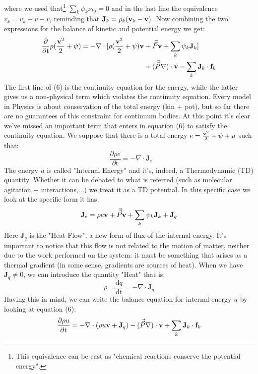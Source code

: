 \documentclass{article}
\newcommand*\diff{\mathop{}\!\mathrm{d}}
\newcommand*\Tder[1]{\mathop{}\!\frac{\diff #1}{\diff \mathrm{t}}}
\newcommand*\tder[1]{\mathop{}\!\frac{\partial #1}{\partial \mathrm{t}} }
\begin{document}
where we used that\footnote{This equivalence can be cast as "chemical reactions conserve the potential energy".} $\sum_k \psi_k\nu_{kj} = 0 $  and in the last line the equivalence $v_k = v_k +v -v$, reminding that $\mathbf{J}_k = \rho_k(\v_v_k -\v_v)$. Now combining the two expressions for the balance of kinetic and potential energy we get:
\begin{equation}
\begin{aligned}
     \tder{}\rho({\frac{\v_v^2}{2} + \psi}) = -\nabla \cdot [\rho(\frac{\v_v^2}{2}+\psi)\v_v &+ \Vec{\Vec{P}}\v_v +\sum_k \psi_k \mathbf{J}_k]\\
     &+(\Vec{\Vec{P}}\nabla) \cdot \v_v -\sum_k \mathbf{J}_k \cdot \mathbf{f}_k
\end{aligned}
\end{equation}
The first line of (6) is the continuity equation for the energy, while the latter gives us a non-physical term which violates the continuity equation. Every model in Physics is about conservation of the total energy (kin + pot), but so far there are no guarantees of this constraint for continuum bodies. At this point it's clear we've missed an important term that enters in equation (6) to satisfy the continuity equation. We suppose that there is a total energy $e = \frac{\v_v^2}{2} +\psi+ u$ such that:
\begin{equation}
\tder{\rho e } = -\nabla\cdot \mathbf{J}_e
\end{equation}
The energy $u$ is called "Internal Energy" and it's, indeed, a Thermodynamic (TD) quantity. Whether it can be debated to what is referred (such as molecular agitation + interactions,...) we treat it as a TD potential. In this specific case we look at the specific form it has:
$$\mathbf{J}_e = \rho e \v_v + \Vec{\Vec{P}}\v_v +\sum_k \psi_k \mathbf{J}_k +\mathbf{J}_q $$
Here $\mathbf{J}_q$ is the "Heat Flow", a new form of flux of the internal energy. It's important to notice that this flow is not related to the motion of matter, neither due to the work performed on the system: it must be something that arises as a thermal gradient (in some sense, gradients are sources of heat). When we have $\mathbf{J}_q \neq 0$, we can introduce the quantity "Heat" that is:
\begin{equation}
   \rho \Tder{q} = -\nabla \cdot \mathbf{J}_q 
\end{equation}
Having this in mind, we can write the balance equation for internal energy $u$ by looking at equation (6):
\begin{equation}
    \tder{\rho u} = -\nabla \cdot (\rho u \v_v +\mathbf{J}_q) -(\Vec{\Vec{P}}\nabla)\cdot\v_v +\sum_k \mathbf{J}_k\cdot \mathbf{f}_k
\end{equation}
\end{document}
